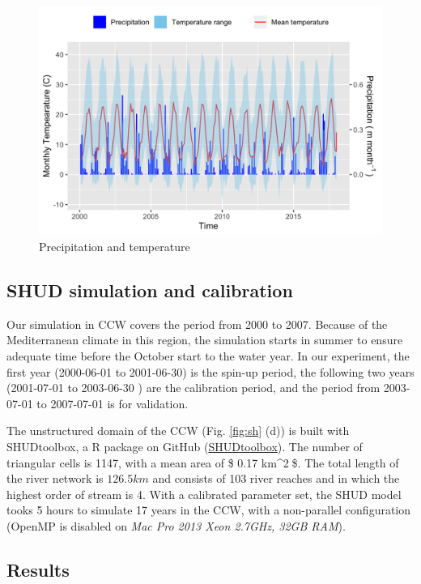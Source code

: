 \documentclass[
]{scrbook}
\begin{document}
\begin{figure}
\centering
\includegraphics{Fig/Example/CacheCreek/sac5_PT.png}
\caption{Precipitation and temperature}
\end{figure}

\hypertarget{shud-simulation-and-calibration}{%
\subsection{SHUD simulation and calibration}\label{shud-simulation-and-calibration}}

Our simulation in CCW covers the period from 2000 to 2007. Because of the Mediterranean climate in this region, the simulation starts in summer to ensure adequate time before the October start to the water year. In our experiment, the first year (2000-06-01 to 2001-06-30) is the spin-up period, the following two years (2001-07-01 to 2003-06-30 ) are the calibration period, and the period from 2003-07-01 to 2007-07-01 is for validation.

The unstructured domain of the CCW (Fig. \ref{fig:sh} (d)) is built with SHUDtoolbox, a R package on GitHub (\href{https://github.com/shud-system/SHUDtoolbox}{SHUDtoolbox}). The number of triangular cells is 1147, with a mean area of \$ 0.17 km\^{}2\$. The total length of the river network is \(126.5 km\) and consists of 103 river reaches and in which the highest order of stream is 4. With a calibrated parameter set, the SHUD model tooks 5 hours to simulate 17 years in the CCW, with a non-parallel configuration (OpenMP is disabled on \emph{Mac Pro 2013 Xeon 2.7GHz, 32GB RAM}).

\hypertarget{results}{%
\subsection{Results}\label{results}}
\end{document}
